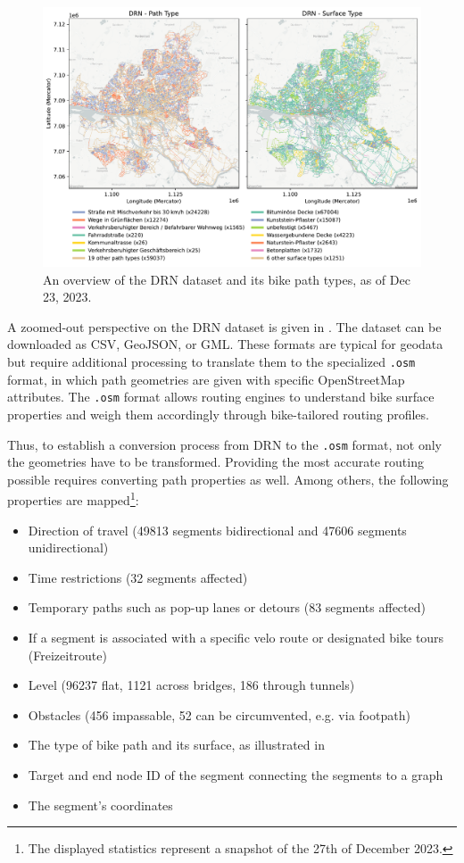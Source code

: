 \begin{figure}[t]
\centering
\includegraphics[width=\linewidth]{images/routing-drn.pdf}
\caption{An overview of the DRN dataset and its bike path types, as of Dec 23, 2023.}
\label{fig:drn-map}
\end{figure}

A zoomed-out perspective on the DRN dataset is given in . The dataset can be downloaded as CSV, GeoJSON, or GML. These formats are typical for geodata but require additional processing to translate them to the specialized \texttt{.osm} format, in which path geometries are given with specific OpenStreetMap attributes. The \texttt{.osm} format allows routing engines to understand bike surface properties and weigh them accordingly through bike-tailored routing profiles.  

Thus, to establish a conversion process from DRN to the \texttt{.osm} format, not only the geometries have to be transformed. Providing the most accurate routing possible requires converting path properties as well. Among others, the following properties are mapped\footnote{The displayed statistics represent a snapshot of the 27th of December 2023.}:

\begin{itemize}
    \item Direction of travel (49813 segments bidirectional and 47606 segments unidirectional)
    \item Time restrictions (32 segments affected)
    \item Temporary paths such as pop-up lanes or detours (83 segments affected)
    \item If a segment is associated with a specific velo route or designated bike tours (Freizeitroute)
    \item Level (96237 flat, 1121 across bridges, 186 through tunnels)
    \item Obstacles (456 impassable, 52 can be circumvented, e.g. via footpath)
    \item The type of bike path and its surface, as illustrated in 
    \item Target and end node ID of the segment connecting the segments to a graph
    \item The segment's coordinates
\end{itemize}

